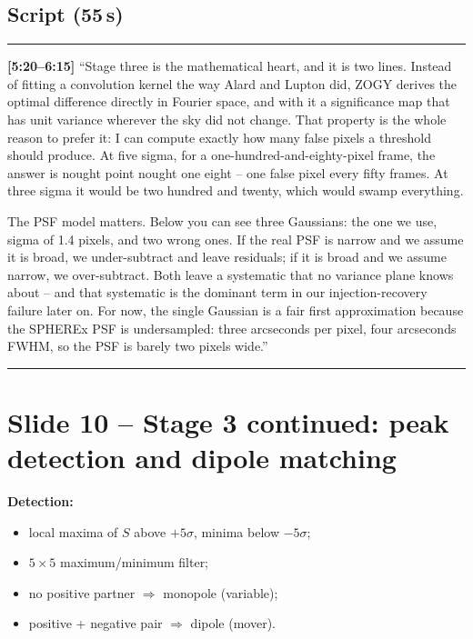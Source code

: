 \documentclass[11pt,a4paper]{article}
\begin{document}
\subsection*{Script (55\,s)}
\noindent\rule{\linewidth}{0.3pt}\par\smallskip\noindent
\textbf{[5:20--6:15]} ``Stage three is the mathematical heart, and it is two lines. Instead of fitting a
convolution kernel the way Alard and Lupton did, ZOGY derives the optimal difference directly in
Fourier space, and with it a significance map that has unit variance wherever the sky did not change.
That property is the whole reason to prefer it: I can compute exactly how many false pixels a threshold
should produce. At five sigma, for a one-hundred-and-eighty-pixel frame, the answer is nought point
nought one eight -- one false pixel every fifty frames. At three sigma it would be two hundred and
twenty, which would swamp everything.

The PSF model matters. Below you can see three Gaussians: the one we use, sigma of 1.4 pixels,
and two wrong ones. If the real PSF is narrow and we assume it is broad, we under-subtract and leave
residuals; if it is broad and we assume narrow, we over-subtract. Both leave a systematic that no
variance plane knows about -- and that systematic is the dominant term in our injection-recovery
failure later on. For now, the single Gaussian is a fair first approximation because the SPHEREx PSF is
undersampled: three arcseconds per pixel, four arcseconds FWHM, so the PSF is barely two pixels wide.''
\par\smallskip\noindent\rule{\linewidth}{0.3pt}

\section{Slide 10 -- Stage 3 continued: peak detection and dipole matching}

\textbf{Detection:}
\begin{itemize}[leftmargin=1em,itemsep=1pt]
\item local maxima of $S$ above $+5\sigma$, minima below $-5\sigma$;
\item $5\times5$ maximum/minimum filter;
\item no positive partner $\Rightarrow$ monopole (variable);
\item positive + negative pair $\Rightarrow$ dipole (mover).
\end{itemize}
\end{document}
